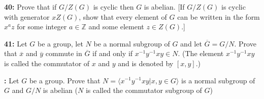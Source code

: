 \documentclass[11pt]{article}
\newenvironment{exercise}[1]
	{\noindent \textbf{#1:}}
	{\par \vspace{0.5\baselineskip}}
\begin{document}
\begin{exercise}{40}
	Prove that if \(G/Z(G)\) is cyclic then \(G\) is abelian. [If \(G/Z(G)\) is cyclic with generator \(xZ(G)\), show that every element of \(G\) can be written in the form \(x^{a}z\) for some integer \(a \in \mathbb{Z}\) and some element \(z \in Z(G)\).]
\end{exercise}{}

\begin{exercise}{41}
	\textsf{Let \(G\) be a group, let \(N\) be a normal subgroup of \(G\) and let \(\overline{G} = G/N\). Prove that \(\overline{x}\) and \(\overline{y}\) commute in \(\overline{G}\) if and only if \(x^{-1}y^{-1}xy \in N\). (The element \(x^{-1}y^{-1}xy\) is called the commutator of \(x\) and \(y\) and is denoted by \([x, y]\).)}
\end{exercise}{}

\begin{exercise}{}
	\textsf{Let \(G\) be a group. Prove that \(N = \langle x^{-1}y^{-1} xy | x, y \in G \rangle\) is a normal subgroup of \(G\) and \(G / N\) is abelian (\(N\) is called the commutator subgroup of \(G\))}
\end{exercise}{}
\end{document}
